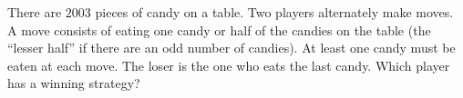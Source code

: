 There are $2003$ pieces of candy on a table. Two players alternately make moves. A move consists of eating one candy or half of the candies on the table (the “lesser half” if there are an odd number of candies). At least one candy must be eaten at each move. The loser is the one who eats the last candy. Which player has a winning strategy?